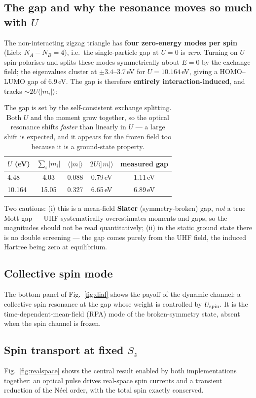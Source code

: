 \documentclass[11pt]{article}
\begin{document}
\subsection{The gap and why the resonance moves so much with $U$}
The non-interacting zigzag triangle has \textbf{four zero-energy modes per spin}
(Lieb; $N_A-N_B=4$), i.e.\ the single-particle gap at $U=0$ is \emph{zero}.
Turning on $U$ spin-polarises and splits these modes symmetrically about $E=0$
by the exchange field; the eigenvalues cluster at $\pm3.4$--$3.7$\,eV for
$U=10.164$\,eV, giving a HOMO--LUMO gap of $6.9$\,eV. The gap is therefore
\textbf{entirely interaction-induced}, and tracks $\sim 2U\langle|m_i|\rangle$:
\begin{table}[h]
\centering
\begin{tabular}{lcccc}
\toprule
$U$ (eV) & $\sum_i|m_i|$ & $\langle|m|\rangle$ & $2U\langle|m|\rangle$ & measured gap\\
\midrule
4.48   & 4.03 & 0.088 & 0.79\,eV & 1.11\,eV\\
10.164 & 15.05 & 0.327 & 6.65\,eV & 6.89\,eV\\
\bottomrule
\end{tabular}
\caption{The gap is set by the self-consistent exchange splitting. Both $U$ and
the moment grow together, so the optical resonance shifts \emph{faster} than
linearly in $U$ --- a large shift is expected, and it appears for the frozen
field too because it is a ground-state property.}
\end{table}
Two cautions: (i) this is a mean-field \textbf{Slater} (symmetry-broken) gap,
\emph{not} a true Mott gap --- UHF systematically overestimates moments and
gaps, so the magnitudes should not be read quantitatively; (ii) in the static
ground state there is no double screening --- the gap comes purely from the UHF
field, the induced Hartree being zero at equilibrium.

\subsection{Collective spin mode}
The bottom panel of Fig.~\ref{fig:dial} shows the payoff of the dynamic channel:
a collective spin resonance at the gap whose weight is controlled by
$U_{\rm spin}$. It is the time-dependent-mean-field (RPA) mode of the
broken-symmetry state, absent when the spin channel is frozen.

\subsection{Spin transport at fixed $S_z$}
Fig.~\ref{fig:realspace} shows the central result enabled by both
implementations together: an optical pulse drives real-space spin currents and a
transient reduction of the N\'eel order, with the total spin exactly conserved.
\end{document}

